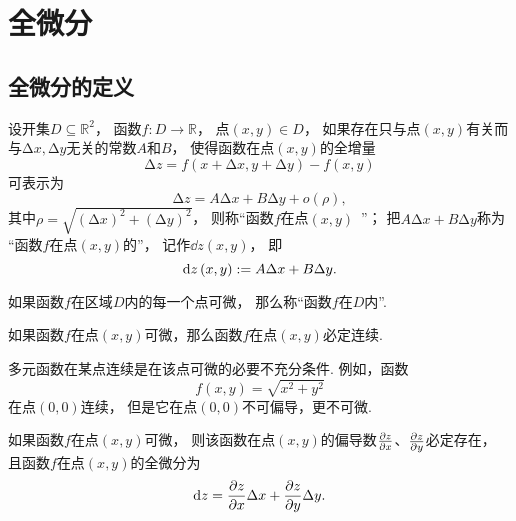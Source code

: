 \section{全微分}
\subsection{全微分的定义}
\begin{definition}
设开集\(D \subseteq \mathbb{R}^2\)，
函数\(f\colon D\to\mathbb{R}\)，
点\((x,y) \in D\)，
如果存在只与点\((x,y)\)有关而与\(\increment x,\increment y\)无关的常数\(A\)和\(B\)，
使得函数在点\((x,y)\)的全增量\[
	\increment z = f(x + \increment x,y + \increment y) - f(x,y)
\]可表示为\[
	\increment z = A \increment x + B \increment y + o(\rho),
\]
其中\(\rho=\sqrt{(\increment x)^2+(\increment y)^2}\)，
则称“函数\(f\)在点\((x,y)\)~”；
把\(A \increment x + B \increment y\)称为
“函数\(f\)在点\((x,y)\)的”，
记作\(\dd{z}(x,y)\)，
即\[
	\dd{z}(x,y)
	:=
	A \Delta x + B \Delta y.
\]
\end{definition}
\begin{definition}
如果函数\(f\)在区域\(D\)内的每一个点可微，
那么称“函数\(f\)在\(D\)内”.
\end{definition}

\begin{theorem}[必要条件1]
如果函数\(f\)在点\((x,y)\)可微，那么函数\(f\)在点\((x,y)\)必定连续.
\end{theorem}
\begin{remark}
多元函数在某点连续是在该点可微的必要不充分条件.
例如，函数\[
	f(x,y) = \sqrt{x^2+y^2}
\]在点\((0,0)\)连续，
但是它在点\((0,0)\)不可偏导，更不可微.
\end{remark}

\begin{theorem}[必要条件2]\label{theorem:多元函数微分法.二元函数可微的必要条件}
如果函数\(f\)在点\((x,y)\)可微，
则该函数在点\((x,y)\)的偏导数\(\pdv{z}{x}\)、\(\pdv{z}{y}\)必定存在，
且函数\(f\)在点\((x,y)\)的全微分为\[
	\dd{z} = \pdv{z}{x} \Delta x + \pdv{z}{y} \Delta y.
\]
\end{theorem}


